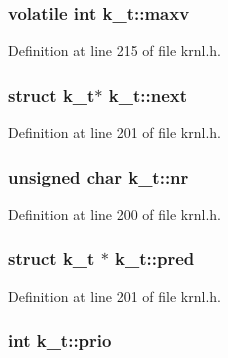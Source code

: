 \subsubsection[{maxv}]{\setlength{\rightskip}{0pt plus 5cm}volatile int k\+\_\+t\+::maxv}\label{structk__t_ab5c4013797f848b7f3d306c8b12375b0}


Definition at line 215 of file krnl.\+h.

\hypertarget{structk__t_ab1bd22ca23083ad81771ed998437fdfc}{}
\subsubsection[{next}]{\setlength{\rightskip}{0pt plus 5cm}struct {\bf k\+\_\+t}$\ast$ k\+\_\+t\+::next}\label{structk__t_ab1bd22ca23083ad81771ed998437fdfc}


Definition at line 201 of file krnl.\+h.

\hypertarget{structk__t_abc0705694abb02c6005759d8ba66f35e}{}
\subsubsection[{nr}]{\setlength{\rightskip}{0pt plus 5cm}unsigned char k\+\_\+t\+::nr}\label{structk__t_abc0705694abb02c6005759d8ba66f35e}


Definition at line 200 of file krnl.\+h.

\hypertarget{structk__t_a600d8611c0af5f63b647ab12d219e0fb}{}
\subsubsection[{pred}]{\setlength{\rightskip}{0pt plus 5cm}struct {\bf k\+\_\+t} $\ast$ k\+\_\+t\+::pred}\label{structk__t_a600d8611c0af5f63b647ab12d219e0fb}


Definition at line 201 of file krnl.\+h.

\hypertarget{structk__t_a024120239a208b97bf2fcd17b9534182}{}
\subsubsection[{prio}]{\setlength{\rightskip}{0pt plus 5cm}int k\+\_\+t\+::prio}\label{structk__t_a024120239a208b97bf2fcd17b9534182}


